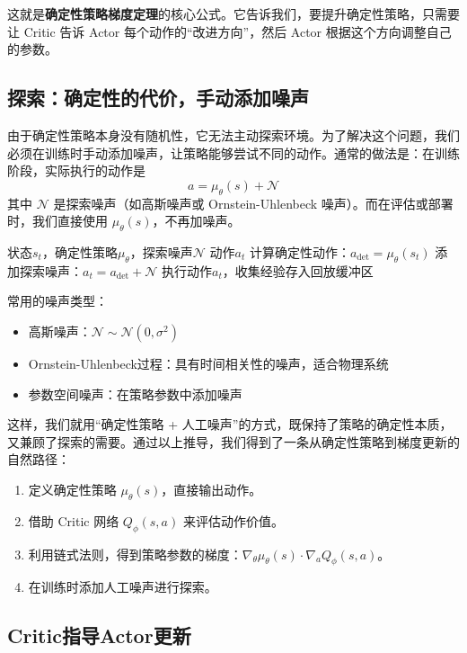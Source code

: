 \documentclass[lang=cn,zihao=-4,a4paper,fontset=windows]{beautybook}
\begin{document}
这就是\textbf{确定性策略梯度定理}的核心公式。它告诉我们，要提升确定性策略，只需要让 Critic 告诉 Actor 每个动作的“改进方向”，然后 Actor 根据这个方向调整自己的参数。

\subsection{探索：确定性的代价，手动添加噪声}

由于确定性策略本身没有随机性，它无法主动探索环境。为了解决这个问题，我们必须在训练时手动添加噪声，让策略能够尝试不同的动作。通常的做法是：在训练阶段，实际执行的动作是
\[
a = \mu_\theta(s) + \mathcal{N}
\]
其中 \(\mathcal{N}\) 是探索噪声（如高斯噪声或 Ornstein-Uhlenbeck 噪声）。而在评估或部署时，我们直接使用 \(\mu_\theta(s)\)，不再加噪声。
\begin{algorithm}[H]
\caption{确定性策略的探索}
\begin{algorithmic}[1]
\REQUIRE 状态$s_t$，确定性策略$\mu_\theta$，探索噪声$\mathcal{N}$
\ENSURE 动作$a_t$
\STATE 计算确定性动作：$a_{\text{det}} = \mu_\theta(s_t)$
\STATE 添加探索噪声：$a_t = a_{\text{det}} + \mathcal{N}$
\STATE 执行动作$a_t$，收集经验存入回放缓冲区
\end{algorithmic}
\end{algorithm}
常用的噪声类型：
\begin{itemize}
    \item 高斯噪声：$\mathcal{N} \sim \mathcal{N}(0, \sigma^2)$
    \item Ornstein-Uhlenbeck过程：具有时间相关性的噪声，适合物理系统
    \item 参数空间噪声：在策略参数中添加噪声
\end{itemize}

这样，我们就用“确定性策略 + 人工噪声”的方式，既保持了策略的确定性本质，又兼顾了探索的需要。通过以上推导，我们得到了一条从确定性策略到梯度更新的自然路径：
\begin{enumerate}
    \item 定义确定性策略 \(\mu_\theta(s)\)，直接输出动作。
    \item 借助 Critic 网络 \(Q_\phi(s,a)\) 来评估动作价值。
    \item 利用链式法则，得到策略参数的梯度：\(\nabla_\theta \mu_\theta(s) \cdot \nabla_a Q_\phi(s,a)\)。
    \item 在训练时添加人工噪声进行探索。
\end{enumerate}

\subsection{Critic指导Actor更新}
\end{document}
